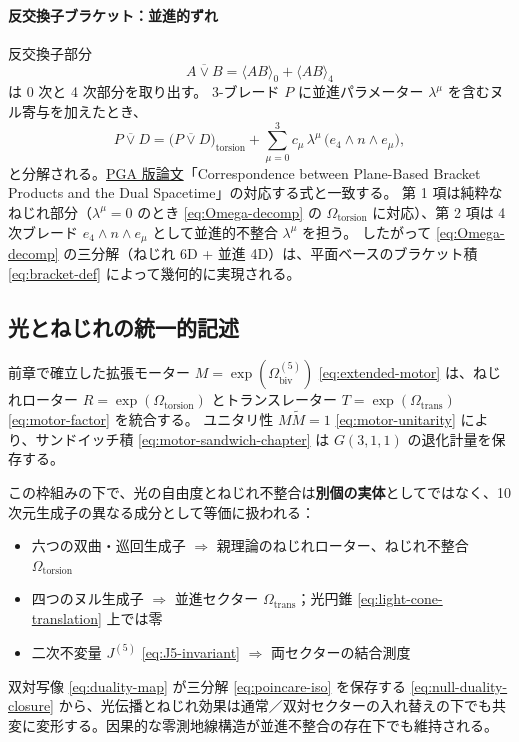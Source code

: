 \documentclass[dvipdfmx,a4paper,oneside]{jsbook}
\numberwithin{equation}{chapter}
\begin{document}
\paragraph{反交換子ブラケット：並進的ずれ}
反交換子部分
\begin{equation}
  A \mathbin{\overline{\vee}} B = \langle AB \rangle_0 + \langle AB \rangle_4
  \label{eq:bracket-anticommutator-grade}
\end{equation}
は 0 次と 4 次部分を取り出す。
3-ブレード \(P\) に並進パラメーター \(\lambda^\mu\) を含むヌル寄与を加えたとき、
\begin{equation}
  P \mathbin{\overline{\vee}} D
  = \bigl(P \mathbin{\overline{\vee}} D\bigr)_{\mathrm{torsion}}
  + \sum_{\mu=0}^{3} c_\mu\, \lambda^\mu\, \bigl(e_4 \wedge n \wedge e_\mu\bigr),
  \label{eq:bracket-translational}
\end{equation}
と分解される。\hyperref[sec:sister-manuscripts]{PGA 版論文}「Correspondence between Plane-Based Bracket Products and the Dual Spacetime」の対応する式と一致する。
第 1 項は純粋なねじれ部分（\(\lambda^\mu = 0\) のとき \eqref{eq:Omega-decomp} の \(\Omega_{\mathrm{torsion}}\) に対応）、第 2 項は 4 次ブレード \(e_4 \wedge n \wedge e_\mu\) として並進的不整合 \(\lambda^\mu\) を担う。
したがって \eqref{eq:Omega-decomp} の三分解（ねじれ 6D + 並進 4D）は、平面ベースのブラケット積 \eqref{eq:bracket-def} によって幾何的に実現される。

\subsection{光とねじれの統一的記述}

前章で確立した拡張モーター \(M = \exp(\Omega_{\mathrm{biv}}^{(5)})\) \eqref{eq:extended-motor} は、ねじれローター \(R = \exp(\Omega_{\mathrm{torsion}})\) とトランスレーター \(T = \exp(\Omega_{\mathrm{trans}})\) \eqref{eq:motor-factor} を統合する。
ユニタリ性 \(M\widetilde{M} = 1\) \eqref{eq:motor-unitarity} により、サンドイッチ積 \eqref{eq:motor-sandwich-chapter} は \(G(3,1,1)\) の退化計量を保存する。

この枠組みの下で、光の自由度とねじれ不整合は\textbf{別個の実体}としてではなく、10 次元生成子の異なる成分として等価に扱われる：
\begin{itemize}[leftmargin=2em]
  \item 六つの双曲・巡回生成子 \(\Rightarrow\) 親理論のねじれローター、ねじれ不整合 \(\Omega_{\mathrm{torsion}}\)
  \item 四つのヌル生成子 \(\Rightarrow\) 並進セクター \(\Omega_{\mathrm{trans}}\)；光円錐 \eqref{eq:light-cone-translation} 上では零
  \item 二次不変量 \(J^{(5)}\) \eqref{eq:J5-invariant} \(\Rightarrow\) 両セクターの結合測度
\end{itemize}
双対写像 \eqref{eq:duality-map} が三分解 \eqref{eq:poincare-iso} を保存する \eqref{eq:null-duality-closure} から、光伝播とねじれ効果は通常／双対セクターの入れ替えの下でも共変に変形する。因果的な零測地線構造が並進不整合の存在下でも維持される。
\end{document}
